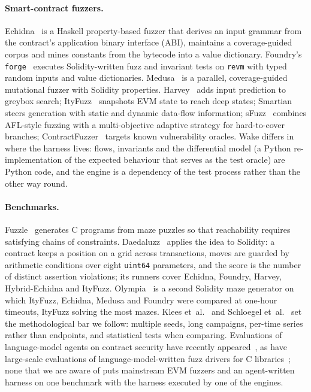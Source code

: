 \documentclass[11pt,a4paper]{article}
\newcommand{\wake}{Wake}
\newcommand{\revm}{\texttt{revm}}
\begin{document}
\paragraph{Smart-contract fuzzers.}
Echidna~\cite{grieco2020echidna} is a Haskell property-based fuzzer that derives an input grammar from the contract's application binary interface (ABI), maintains a coverage-guided corpus and mines constants from the bytecode into a value dictionary. Foundry's \texttt{forge}~\cite{foundry} executes Solidity-written fuzz and invariant tests on \revm{} with typed random inputs and value dictionaries. Medusa~\cite{medusa} is a parallel, coverage-guided mutational fuzzer with Solidity properties. Harvey~\cite{wustholz2020harvey} adds input prediction to greybox search; ItyFuzz~\cite{shou2023ityfuzz} snapshots EVM state to reach deep states; Smartian~\cite{choi2021smartian} steers generation with static and dynamic data-flow information; sFuzz~\cite{nguyen2020sfuzz} combines AFL-style fuzzing with a multi-objective adaptive strategy for hard-to-cover branches; ContractFuzzer~\cite{jiang2018contractfuzzer} targets known vulnerability oracles. \wake{} differs in where the harness lives: flows, invariants and the differential model (a Python re-implementation of the expected behaviour that serves as the test oracle) are Python code, and the engine is a dependency of the test process rather than the other way round.

\paragraph{Benchmarks.}
Fuzzle~\cite{lee2022fuzzle} generates C programs from maze puzzles so that reachability requires satisfying chains of constraints. Daedaluzz~\cite{daedaluzz2023,wustholz2023benchmarking} applies the idea to Solidity: a contract keeps a position on a grid across transactions, moves are guarded by arithmetic conditions over eight \texttt{uint64} parameters, and the score is the number of distinct assertion violations; its runners cover Echidna, Foundry, Harvey, Hybrid-Echidna and ItyFuzz. Olympia~\cite{chadt2024olympia} is a second Solidity maze generator on which ItyFuzz, Echidna, Medusa and Foundry were compared at one-hour timeouts, ItyFuzz solving the most mazes. Klees et~al.~\cite{klees2018evaluating} and Schloegel et~al.~\cite{schloegel2024sok} set the methodological bar we follow: multiple seeds, long campaigns, per-time series rather than endpoints, and statistical tests when comparing. Evaluations of language-model agents on contract security have recently appeared~\cite{wang2026evmbench,gattermayer2026frontier}, as have large-scale evaluations of language-model-written fuzz drivers for C libraries~\cite{zhang2024fuzzdriver}; none that we are aware of puts mainstream EVM fuzzers and an agent-written harness on one benchmark with the harness executed by one of the engines.
\end{document}
